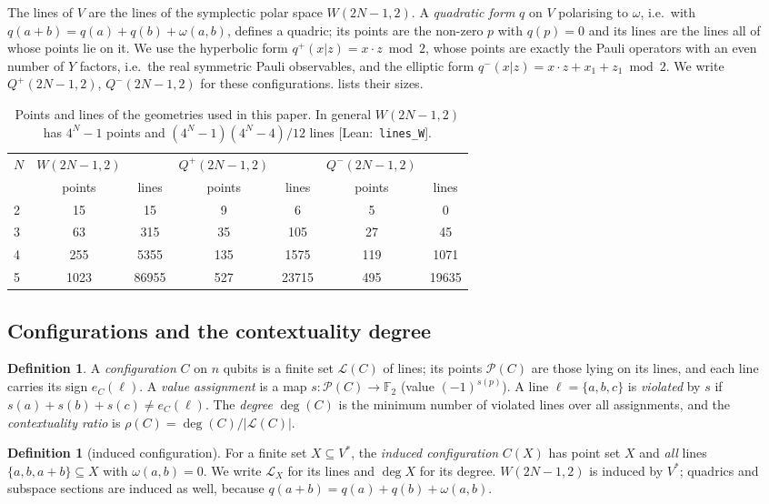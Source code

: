 \documentclass[a4paper,onecolumn,11pt,unpublished,nopdfoutputerror]{quantumarticle}
\theoremstyle{definition}
\newtheorem{definition}[theorem]{Definition}
\newcommand{\leanin}[1]{{\footnotesize\color{leangreen}[\textsf{Lean}:~\texttt{#1}]}}
\newcommand{\F}{\mathbb{F}_2}
\renewcommand{\deg}{\operatorname{deg}}
\newcommand{\Lines}{\mathcal{L}}
\newcommand{\Pts}{\mathcal{P}}
\newcommand{\W}[1]{W(#1,2)}
\newcommand{\Qp}[1]{Q^{+}(#1,2)}
\newcommand{\Qm}[1]{Q^{-}(#1,2)}
\newcommand{\Vs}{V^{\ast}}
\begin{document}
The lines of $V$ are the lines of the symplectic polar space $\W{2N-1}$. A \emph{quadratic form} $q$ on
$V$ polarising to $\omega$, i.e.\ with $q(a+b)=q(a)+q(b)+\omega(a,b)$, defines a quadric; its points are the
non-zero $p$ with $q(p)=0$ and its lines are the lines all of whose points lie on it. We use the hyperbolic form
$q^+(x|z)=x\cdot z \bmod 2$, whose points are exactly the Pauli operators with an even number of $Y$ factors,
i.e.\ the real symmetric Pauli observables, and the elliptic form $q^-(x|z)=x\cdot z+x_1+z_1\bmod 2$. We write
$\Qp{2N-1}$, $\Qm{2N-1}$ for these configurations.  lists their sizes.

\begin{table}[h]
\centering\small
\begin{tabular}{@{}lcccccc@{}}
\toprule
$N$ & $\W{2N-1}$ & & $\Qp{2N-1}$ & & $\Qm{2N-1}$ &\\
& points & lines & points & lines & points & lines\\\midrule
2 & 15 & 15 & 9 & 6 & 5 & 0\\
3 & 63 & 315 & 35 & 105 & 27 & 45\\
4 & 255 & 5355 & 135 & 1575 & 119 & 1071\\
5 & 1023 & 86955 & 527 & 23715 & 495 & 19635\\\bottomrule
\end{tabular}
\caption{Points and lines of the geometries used in this paper. In general $\W{2N-1}$ has $4^N-1$ points and
$(4^N-1)(4^N-4)/12$ lines \leanin{lines\_W}.}
\label{tab:counts}
\end{table}

\subsection{Configurations and the contextuality degree}
\begin{definition}
A \emph{configuration} $C$ on $n$ qubits is a finite set $\Lines(C)$ of lines; its points $\Pts(C)$ are those
lying on its lines, and each line carries its sign $e_C(\ell)$. A \emph{value assignment} is a map
$s:\Pts(C)\to\F$ (value $(-1)^{s(p)}$). A line $\ell=\{a,b,c\}$ is \emph{violated} by $s$ if
$s(a)+s(b)+s(c)\neq e_C(\ell)$. The \emph{degree} $\deg(C)$ is the minimum number of violated lines over all
assignments, and the \emph{contextuality ratio} is $\rho(C)=\deg(C)/|\Lines(C)|$.
\end{definition}

\begin{definition}[induced configuration]
For a finite set $X\subseteq\Vs$, the \emph{induced configuration} $C(X)$ has point set $X$ and \emph{all} lines
$\{a,b,a+b\}\subseteq X$ with $\omega(a,b)=0$. We write $\Lines_X$ for its lines and $\deg X$ for its degree.
$\W{2N-1}$ is induced by $\Vs$; quadrics and subspace sections are induced as well, because
$q(a+b)=q(a)+q(b)+\omega(a,b)$.
\end{definition}
\end{document}
